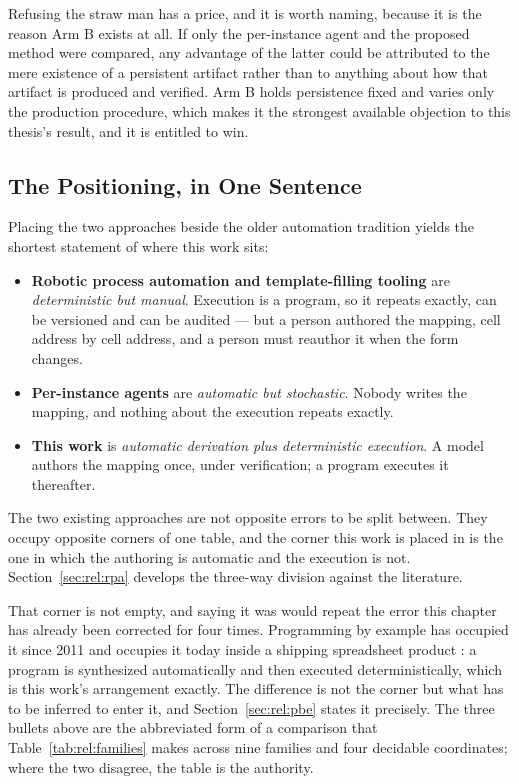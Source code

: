 Refusing the straw man has a price, and it is worth naming, because it is the reason Arm B
exists at all. If only the per-instance agent and the proposed method were compared, any
advantage of the latter could be attributed to the mere existence of a persistent artifact
rather than to anything about how that artifact is produced and verified. Arm B holds
persistence fixed and varies only the production procedure, which makes it the strongest
available objection to this thesis's result, and it is entitled to win.

\subsection{The Positioning, in One Sentence}
\label{sec:intro:existing:taxonomy}

Placing the two approaches beside the older automation tradition yields the shortest
statement of where this work sits:

\begin{itemize}
  \item \textbf{Robotic process automation and template-filling tooling} are
    \emph{deterministic but manual}. Execution is a program, so it repeats exactly, can be
    versioned and can be audited --- but a person authored the mapping, cell address by cell
    address, and a person must reauthor it when the form changes.
  \item \textbf{Per-instance agents} are \emph{automatic but stochastic}. Nobody writes the
    mapping, and nothing about the execution repeats exactly.
  \item \textbf{This work} is \emph{automatic derivation plus deterministic execution}. A
    model authors the mapping once, under verification; a program executes it thereafter.
\end{itemize}

The two existing approaches are not opposite errors to be split between. They occupy
opposite corners of one table, and the corner this work is placed in is the one in which the
authoring is automatic and the execution is not. Section~\ref{sec:rel:rpa} develops the
three-way division against the literature.

That corner is not empty, and saying it was would repeat the error this chapter has already
been corrected for four times. Programming by example has occupied it since 2011
\cite{gulwani2011flashfill} and occupies it today inside a shipping spreadsheet product
\cite{cambronero2023flashfillpp}: a program is synthesized automatically and then executed
deterministically, which is this work's arrangement exactly. The difference is not the corner
but what has to be inferred to enter it, and Section~\ref{sec:rel:pbe} states it precisely. The
three bullets above are the abbreviated form of a comparison that
Table~\ref{tab:rel:families} makes across nine families and four decidable coordinates; where
the two disagree, the table is the authority.

